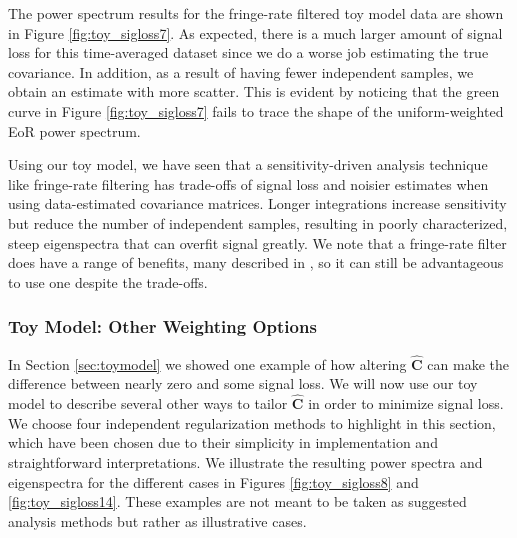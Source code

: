 \documentclass[preprint2,numberedappendix,tighten]{aastex6}
\begin{document}
The power spectrum results for the fringe-rate filtered toy model data are shown in Figure \ref{fig:toy_sigloss7}. As 
expected, there is a much larger amount of signal loss for this time-averaged dataset since we do a worse job estimating the true covariance. In addition, as a result of having fewer independent samples, we obtain an estimate with more scatter. This is evident by noticing that the 
green curve in Figure \ref{fig:toy_sigloss7} fails to trace the shape of the uniform-weighted EoR power spectrum.

Using our toy model, we have seen that a sensitivity-driven analysis technique like fringe-rate filtering has trade-offs of signal 
loss and noisier estimates when using data-estimated covariance matrices. Longer integrations increase sensitivity but reduce 
the number of independent samples, resulting in poorly characterized, steep eigenspectra that can overfit signal greatly. We 
note that a fringe-rate filter does have a range of benefits, many described in \citet{parsons_et_al2016}, so it can still be 
advantageous to use one despite the trade-offs.

\subsubsection{Toy Model: Other Weighting Options}
\label{sec:otherweight}

In Section \ref{sec:toymodel} we showed one example of how altering $\widehat{\textbf{C}}$ can 
make the difference between nearly zero and some signal loss. We will now use our toy model to describe several other ways to tailor $\widehat{\textbf{C}}$ 
in order to minimize signal loss. We choose four independent regularization methods to highlight in this section, which have 
been chosen due to their simplicity in implementation and straightforward interpretations. We illustrate the resulting power 
spectra and eigenspectra for the different cases in Figures \ref{fig:toy_sigloss8} and \ref{fig:toy_sigloss14}. These examples are not meant to be taken as suggested analysis methods but rather as illustrative cases. 
\end{document}
